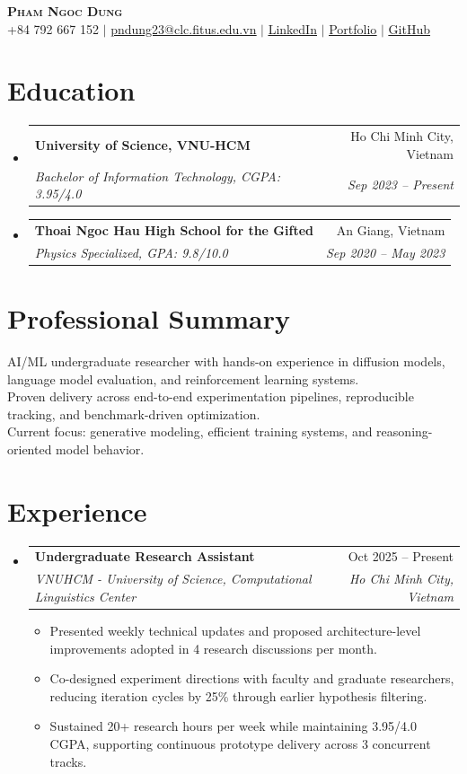 \documentclass[letterpaper,11pt]{article}
\makeatletter
\newcommand{\resumeItem}[1]{
  \item\small{{#1 \vspace{-2pt}}}
}
\newcommand{\resumeSubheading}[4]{
  \vspace{-2pt}\item
    \begin{tabular*}{0.97\textwidth}[t]{l@{\extracolsep{\fill}}r}
      \textbf{#1} & #2 \\
      \textit{\small#3} & \textit{\small #4} \\
    \end{tabular*}\vspace{-7pt}
}
\newcommand{\resumeSubHeadingListStart}{\begin{itemize}[leftmargin=0.15in, label={}]}
\newcommand{\resumeSubHeadingListEnd}{\end{itemize}}
\newcommand{\resumeItemListStart}{\begin{itemize}[leftmargin=0.2in]}
\newcommand{\resumeItemListEnd}{\end{itemize}\vspace{-5pt}}
\makeatother
\begin{document}
\begin{center}
    \textbf{\Huge \scshape Pham Ngoc Dung} \\ \vspace{1pt}
    \small +84 792 667 152 $|$ \href{mailto:pndung23@clc.fitus.edu.vn}{\underline{pndung23@clc.fitus.edu.vn}} $|$
    \href{https://www.linkedin.com/in/dung-pham-99014b29a/}{\underline{LinkedIn}} $|$
    \href{https://dzungphieuluuky.github.io/}{\underline{Portfolio}} $|$
    \href{https://github.com/dzungphieuluuky}{\underline{GitHub}}
\end{center}

\section{Education}
  \resumeSubHeadingListStart
    \resumeSubheading
      {University of Science, VNU-HCM}{Ho Chi Minh City, Vietnam}
      {Bachelor of Information Technology, CGPA: 3.95/4.0}{Sep 2023 -- Present}
    \resumeSubheading
      {Thoai Ngoc Hau High School for the Gifted}{An Giang, Vietnam}
      {Physics Specialized, GPA: 9.8/10.0}{Sep 2020 -- May 2023}
  \resumeSubHeadingListEnd

\section{Professional Summary}
\begin{itemize}[leftmargin=0.15in, label={}]
  \small{\item{
    AI/ML undergraduate researcher with hands-on experience in diffusion models, language model evaluation, and reinforcement learning systems. \\
    Proven delivery across end-to-end experimentation pipelines, reproducible tracking, and benchmark-driven optimization. \\
    Current focus: generative modeling, efficient training systems, and reasoning-oriented model behavior.
  }}
\end{itemize}

\section{Experience}
  \resumeSubHeadingListStart
    \resumeSubheading
      {Undergraduate Research Assistant}{Oct 2025 -- Present}
      {VNUHCM - University of Science, Computational Linguistics Center}{Ho Chi Minh City, Vietnam}
      \resumeItemListStart
        \resumeItem{Presented weekly technical updates and proposed architecture-level improvements adopted in 4 research discussions per month.}
        \resumeItem{Co-designed experiment directions with faculty and graduate researchers, reducing iteration cycles by 25\% through earlier hypothesis filtering.}
        \resumeItem{Sustained 20+ research hours per week while maintaining 3.95/4.0 CGPA, supporting continuous prototype delivery across 3 concurrent tracks.}
      \resumeItemListEnd
  \resumeSubHeadingListEnd
\end{document}
